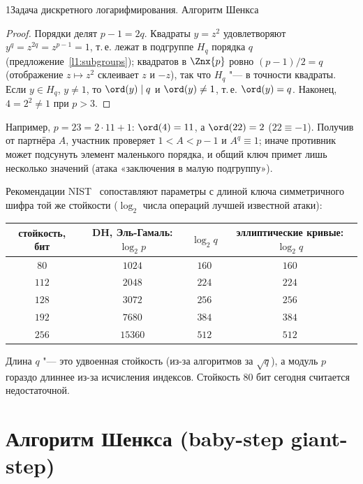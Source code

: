 \begin{lecture}{1}{Задача дискретного логарифмирования. Алгоритм Шенкса}
\begin{proof}
Порядки делят $p - 1 = 2q$. Квадраты $y = z^2$ удовлетворяют $y^q = z^{2q} = z^{p-1} = 1$, т.\,е.
лежат в подгруппе $H_q$ порядка $q$ (предложение~\ref{l1:subgroups}); квадратов в $\Znx{p}$ ровно
$(p-1)/2 = q$ (отображение $z \mapsto z^2$ склеивает $z$ и $-z$), так что $H_q$ "--- в точности
квадраты. Если $y \in H_q$, $y \ne 1$, то $\ord(y) \mid q$ и $\ord(y) \ne 1$, т.\,е. $\ord(y) = q$.
Наконец, $4 = 2^2 \ne 1$ при $p > 3$.
\end{proof}

Например, $p = 23 = 2 \cdot 11 + 1$: $\ord(4) = 11$, а $\ord(22) = 2$ ($22 \equiv -1$). Получив от
партнёра $A$, участник проверяет $1 < A < p - 1$ и $A^q \equiv 1$; иначе противник может подсунуть
элемент маленького порядка, и общий ключ примет лишь несколько значений (атака «заключения
в малую подгруппу»).

\begin{remark}
Рекомендации NIST~\cite[табл.~2]{nist-sp800-57} сопоставляют параметры с длиной ключа
симметричного шифра той же стойкости ($\log_2$ числа операций лучшей известной атаки):
\begin{center}
\begin{tabular}{c|c|c|c}
  стойкость, бит & DH, Эль-Гамаль: $\log_2 p$ & $\log_2 q$ & эллиптические кривые: $\log_2 q$ \\ \hline
  $80$  & $1024$  & $160$ & $160$ \\
  $112$ & $2048$  & $224$ & $224$ \\
  $128$ & $3072$  & $256$ & $256$ \\
  $192$ & $7680$  & $384$ & $384$ \\
  $256$ & $15360$ & $512$ & $512$
\end{tabular}
\end{center}
Длина $q$ "--- это удвоенная стойкость (из-за алгоритмов за $\sqrt q$), а модуль $p$ гораздо
длиннее из-за исчисления индексов. Стойкость $80$ бит сегодня считается недостаточной.
\end{remark}


\section{Алгоритм Шенкса (baby-step giant-step)}


\end{lecture}
